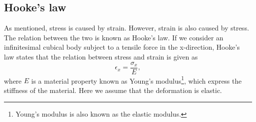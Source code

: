 \documentclass[twoside,english]{uiofysmaster}
\begin{document}
\subsection{Hooke's law}
As mentioned, stress is caused by strain. However, strain is also caused by stress. 
The relation between the two is known as Hooke's law. 
If we consider an infinitesimal cubical body subject to a tensile force in the x-direction, Hooke's law states that the relation between stress and strain is given as
\begin{equation}
\epsilon_x = \frac{\sigma_x}{E}, \label{eq:stressStrainHookesLawX}
\end{equation}
where $E$ is a material property known as Young's modulus\footnote{Young's modulus is also known as the elastic modulus.}, which express the stiffness of the material. 
Here we assume that the deformation is elastic.
\end{document}
